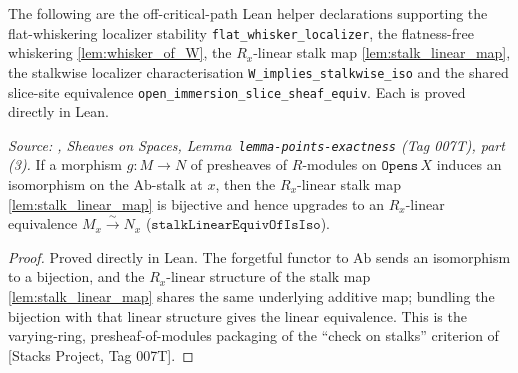 The following are the off-critical-path Lean helper declarations supporting the
flat-whiskering localizer stability \texttt{flat\_whisker\_localizer}, the
flatness-free whiskering \cref{lem:whisker_of_W}, the \(R_x\)-linear stalk map
\cref{lem:stalk_linear_map}, the stalkwise localizer characterisation
\texttt{W\_implies\_stalkwise\_iso} and the shared slice-site equivalence
\texttt{open\_immersion\_slice\_sheaf\_equiv}. Each is proved directly in Lean.

\begin{lemma}
  \label{lem:iso_iff_stalk_bijective}
  \textit{Source: \cite{stacks-project}, Sheaves on Spaces, Lemma~\texttt{lemma-points-exactness}
  (Tag 007T), part (3).}
  If a morphism \(g\colon M \to N\) of presheaves of \(R\)-modules on
  \(\mathtt{Opens}\,X\) induces an isomorphism on the \(\mathrm{Ab}\)-stalk at \(x\),
  then the \(R_x\)-linear stalk map \cref{lem:stalk_linear_map} is bijective and hence
  upgrades to an \(R_x\)-linear equivalence \(M_x \xrightarrow{\sim} N_x\)
  (\(\mathtt{stalkLinearEquivOfIsIso}\)).
\end{lemma}
\begin{proof}
  Proved directly in Lean. The forgetful functor to \(\mathrm{Ab}\) sends an isomorphism
  to a bijection, and the \(R_x\)-linear structure of the stalk map
  \cref{lem:stalk_linear_map} shares the same underlying additive map; bundling the
  bijection with that linear structure gives the linear equivalence. This is the
  varying-ring, presheaf-of-modules packaging of the ``check on stalks'' criterion of
  [Stacks Project, Tag 007T].
\end{proof}

